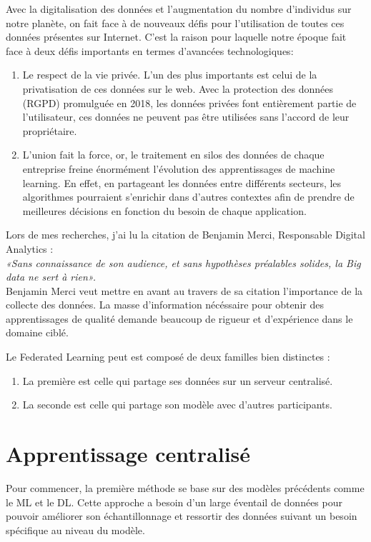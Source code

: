 \documentclass[12pt,a4paper,french]{report}
\begin{document}
Avec la digitalisation des données et l'augmentation du nombre d'individus sur notre planète, on fait face à de nouveaux défis pour l'utilisation de toutes ces données présentes sur Internet. C'est la raison pour laquelle notre époque fait face à deux défis importants en termes d'avancées technologiques: \\
\begin{enumerate}
\item Le respect de la vie privée. L'un des plus importants est celui de la privatisation de ces données sur le web. Avec la protection des données (RGPD) promulguée en 2018, les données privées font entièrement partie de l'utilisateur, ces données ne peuvent pas être utilisées sans l'accord de leur propriétaire.
\item L'union fait la force, or, le traitement en silos des données de chaque entreprise freine énormément l'évolution des apprentissages de machine learning. En effet, en partageant les données entre différents secteurs, les algorithmes pourraient s'enrichir dans d'autres contextes afin de prendre de meilleures décisions en fonction du besoin de chaque application.
\end{enumerate}
Lors de mes recherches, j'ai lu la citation de Benjamin Merci, Responsable Digital Analytics : \\
\textit{«Sans connaissance de son audience, et sans hypothèses préalables solides, la Big data ne sert à rien».}\\
Benjamin Merci veut mettre en avant au travers de sa citation l'importance de la collecte des données. La masse d'information nécéssaire pour obtenir des apprentissages de qualité demande beaucoup de rigueur et d'expérience dans le domaine ciblé.\\
\pagebreak

Le Federated Learning peut est composé de deux familles bien distinctes :
\begin{enumerate}
\item La première est celle qui partage ses données sur un serveur centralisé.
\item La seconde est celle qui partage son modèle avec d'autres participants.
\end{enumerate}

\section{Apprentissage centralisé}

Pour commencer, la première méthode se base sur des modèles précédents comme le ML et le DL. Cette approche a besoin d'un large éventail de données pour pouvoir améliorer son échantillonnage et ressortir des données suivant un besoin spécifique au niveau du modèle.\\
\end{document}
